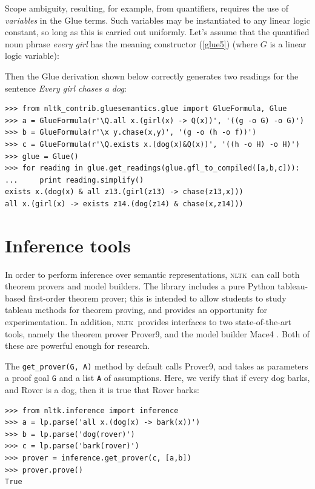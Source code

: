 \documentclass[11pt, a4paper]{article}
\newcommand{\NLTK}{\textsc{nltk}}
\begin{document}
Scope ambiguity, resulting, for example, from quantifiers, requires the
use of \textit{variables} in the Glue terms. Such variables may be
instantiated to any linear logic constant, so long as this is carried
out uniformly. Let's assume that the quantified noun phrase
\textit{every girl} has the meaning constructor (\ref{glue5}) (where
$G$ is a linear logic variable):

Then the Glue derivation shown below correctly
generates two readings for the sentence \textit{Every girl chases a dog}:
\begin{Verbatim}
>>> from nltk_contrib.gluesemantics.glue import GlueFormula, Glue
>>> a = GlueFormula(r'\Q.all x.(girl(x) -> Q(x))', '((g -o G) -o G)')
>>> b = GlueFormula(r'\x y.chase(x,y)', '(g -o (h -o f))')
>>> c = GlueFormula(r'\Q.exists x.(dog(x)&Q(x))', '((h -o H) -o H)')
>>> glue = Glue()
>>> for reading in glue.get_readings(glue.gfl_to_compiled([a,b,c])):
...     print reading.simplify()
exists x.(dog(x) & all z13.(girl(z13) -> chase(z13,x)))
all x.(girl(x) -> exists z14.(dog(z14) & chase(x,z14)))
\end{Verbatim}


\section{Inference tools}
In order to perform inference over semantic representations, \NLTK\
can call both theorem provers and model builders.
The library includes a pure Python tableau-based first-order theorem prover;
this is intended to allow students to study 
tableau methods for theorem proving, and provides an
opportunity for experimentation.  In addition, \NLTK\ provides
interfaces to two state-of-the-art tools, namely the theorem prover Prover9, 
and the model builder Mace4  \citep{McCune}.  Both of these are
powerful enough for research.

The \verb!get_prover(G, A)! method by default calls Prover9, and takes as
parameters a proof goal \texttt{G} and a list \texttt{A} of assumptions.
Here, we verify that if every dog barks, and Rover is a dog,
then it is true that Rover barks:
\begin{Verbatim}
>>> from nltk.inference import inference
>>> a = lp.parse('all x.(dog(x) -> bark(x))')
>>> b = lp.parse('dog(rover)')
>>> c = lp.parse('bark(rover)')
>>> prover = inference.get_prover(c, [a,b])
>>> prover.prove()
True
\end{Verbatim}
\end{document}

